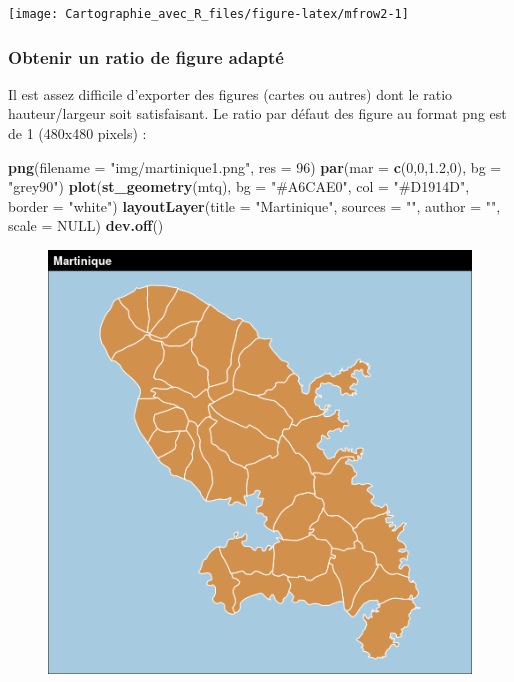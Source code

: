 \documentclass[]{book}
\newenvironment{Shaded}{\begin{snugshade}}{\end{snugshade}}
\newcommand{\KeywordTok}[1]{\textcolor[rgb]{0.13,0.29,0.53}{\textbf{#1}}}
\newcommand{\DataTypeTok}[1]{\textcolor[rgb]{0.13,0.29,0.53}{#1}}
\newcommand{\DecValTok}[1]{\textcolor[rgb]{0.00,0.00,0.81}{#1}}
\newcommand{\FloatTok}[1]{\textcolor[rgb]{0.00,0.00,0.81}{#1}}
\newcommand{\StringTok}[1]{\textcolor[rgb]{0.31,0.60,0.02}{#1}}
\newcommand{\OtherTok}[1]{\textcolor[rgb]{0.56,0.35,0.01}{#1}}
\newcommand{\NormalTok}[1]{#1}
\begin{document}
\begin{center}\texttt{[image: Cartographie\_avec\_R\_files/figure-latex/mfrow2-1]} \end{center}

\subsubsection{Obtenir un ratio de figure
adapté}\label{obtenir-un-ratio-de-figure-adapte}

Il est assez difficile d'exporter des figures (cartes ou autres) dont le
ratio hauteur/largeur soit satisfaisant. Le ratio par défaut des figure
au format png est de 1 (480x480 pixels) :

\begin{Shaded}
\begin{Highlighting}[]
\KeywordTok{png}\NormalTok{(}\DataTypeTok{filename =} \StringTok{"img/martinique1.png"}\NormalTok{, }\DataTypeTok{res =} \DecValTok{96}\NormalTok{)}
\KeywordTok{par}\NormalTok{(}\DataTypeTok{mar =} \KeywordTok{c}\NormalTok{(}\DecValTok{0}\NormalTok{,}\DecValTok{0}\NormalTok{,}\FloatTok{1.2}\NormalTok{,}\DecValTok{0}\NormalTok{), }\DataTypeTok{bg =} \StringTok{"grey90"}\NormalTok{)}
\KeywordTok{plot}\NormalTok{(}\KeywordTok{st_geometry}\NormalTok{(mtq), }\DataTypeTok{bg =} \StringTok{"#A6CAE0"}\NormalTok{, }\DataTypeTok{col =} \StringTok{"#D1914D"}\NormalTok{, }\DataTypeTok{border =} \StringTok{"white"}\NormalTok{)}
\KeywordTok{layoutLayer}\NormalTok{(}\DataTypeTok{title =} \StringTok{"Martinique"}\NormalTok{, }\DataTypeTok{sources =} \StringTok{""}\NormalTok{, }\DataTypeTok{author =} \StringTok{""}\NormalTok{, }\DataTypeTok{scale =} \OtherTok{NULL}\NormalTok{)}
\KeywordTok{dev.off}\NormalTok{()}
\end{Highlighting}
\end{Shaded}

\begin{figure}
\centering
\includegraphics{img/martinique1.png}
\caption{}
\end{figure}
\end{document}
